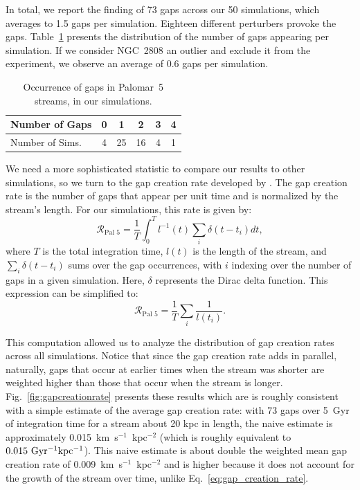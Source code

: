         In total, we report the finding of 73 gaps across our 50 simulations, which averages to 1.5 gaps per simulation. Eighteen different perturbers provoke the gaps. Table~\ref{table:gap_distribution} presents the distribution of the number of gaps appearing per simulation. If we consider NGC~2808 an outlier and exclude it from the experiment, we observe an average of 0.6 gaps per simulation.  

        \begin{table}[h]
            \centering
            \caption{Occurrence of gaps in Palomar~5 streams, in our simulations.}\label{table:gap_distribution}
            \begin{tabular}{|l|c|c|c|c|c|}
                \hline
                Number of Gaps & 0 & 1 & 2 & 3 & 4 \\
                \hline
                Number of Sims. & 4 & 25 & 16 & 4 & 1 \\
                \hline
            \end{tabular}
            \vspace{0.5cm}
        \end{table}

        We need a more sophisticated statistic to compare our results to other simulations, so we turn to the gap creation rate developed by \citet{2012ApJ...748...20C}. The gap creation rate is the number of gaps that appear per unit time and is normalized by the stream's length. For our simulations, this rate is given by: \begin{equation} \label{eq:gap_creation_rate} \mathcal{R}_{\textrm{Pal 5}} =  \frac{1}{T}\int_{0}^T l^{-1}(t) \sum_i \delta(t-t_i) dt,\end{equation}where $T$ is the total integration time, $l(t)$ is the length of the stream, and $\sum_i \delta(t-t_i)$ sums over the gap occurrences, with $i$ indexing over the number of gaps in a given simulation. Here, $\delta$ represents the Dirac delta function. This expression can be simplified to:\begin{equation}\mathcal{R}_{\textrm{Pal 5}} =  \frac{1}{T} \sum_i \frac{1}{l (t_i)}. \end{equation}
        
        This computation allowed us to analyze the distribution of gap creation rates across all simulations. Notice that since the gap creation rate adds in parallel, naturally, gaps that occur at earlier times when the stream was shorter are weighted higher than those that occur when the stream is longer. Fig.~\ref{fig:gapcreationrate} presents these results which are is roughly consistent with a simple estimate of the average gap creation rate: with 73 gaps over 5~Gyr of integration time for a stream about 20 kpc in length, the naive estimate is approximately 0.015~km~s$^{-1}$~kpc$^{-2} $ (which is roughly equivalent to $0.015~\rm{Gyr^{-1}kpc^{-1}}$). This naive estimate is about double the weighted mean gap creation rate of 0.009~km~s$^{-1}$~kpc$^{-2}$ and is higher because it does not account for the growth of the stream over time, unlike Eq.~\ref{eq:gap_creation_rate}.

